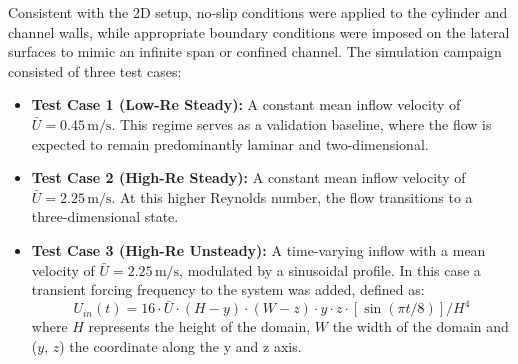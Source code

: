 \documentclass[11pt,a4paper]{article}
\begin{document}
Consistent with the 2D setup, no-slip conditions were applied to the cylinder and channel walls, while appropriate boundary conditions were imposed on the lateral surfaces to mimic an infinite span or confined channel. The simulation campaign consisted of three test cases:

\begin{itemize}
    \item \textbf{Test Case 1 (Low-Re Steady):} A constant mean inflow velocity of $\bar{U} = 0.45\,\text{m/s}$. This regime serves as a validation baseline, where the flow is expected to remain predominantly laminar and two-dimensional.

    \item \textbf{Test Case 2 (High-Re Steady):} A constant mean inflow velocity of $\bar{U} = 2.25\,\text{m/s}$. At this higher Reynolds number, the flow transitions to a three-dimensional state.

    \item \textbf{Test Case 3 (High-Re Unsteady):} A time-varying inflow with a mean velocity of $\bar{U} = 2.25\,\text{m/s}$, modulated by a sinusoidal profile. In this case a transient forcing frequency to the system was added, defined as:
    \begin{equation}
    \label{eq:inlet_velocity_3D}
        U_{in}(t) = 16 \cdot \bar{U} \cdot (H - y) \cdot (W - z) \cdot y \cdot z \cdot\left[\sin(\pi t/8  )  \right] / H^4
    \end{equation}
    where $H$ represents the height of the domain, $W$ the width of the domain and ($y$, $z$) the coordinate along the y and z axis.
\end{itemize}
\end{document}
